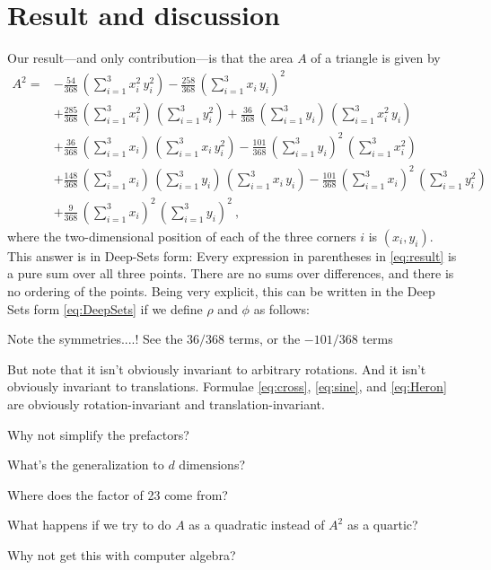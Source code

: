 \documentclass[12pt]{article}
\begin{document}
\section{Result and discussion}\label{sec:result}
Our result---and only contribution---is that the area $A$ of a triangle is given by
\begin{align}
A^2 = &
-\frac{ 54}{368}\,(\sum_{i=1}^3 x_i^2\,y_i^2) 
-\frac{258}{368}\,(\sum_{i=1}^3 x_i\,y_i)^2 \nonumber \\ &
+\frac{285}{368}\,(\sum_{i=1}^3 x_i^2)\,(\sum_{i=1}^3 y_i^2) 
+\frac{ 36}{368}\,(\sum_{i=1}^3 y_i)\,(\sum_{i=1}^3 x_i^2\,y_i) \nonumber \\ &
+\frac{ 36}{368}\,(\sum_{i=1}^3 x_i)\,(\sum_{i=1}^3 x_i\,y_i^2) 
-\frac{101}{368}\,(\sum_{i=1}^3 y_i)^2\,(\sum_{i=1}^3 x_i^2) \nonumber \\ &
+\frac{148}{368}\,(\sum_{i=1}^3 x_i)\,(\sum_{i=1}^3 y_i)\,(\sum_{i=1}^3 x_i\,y_i) 
-\frac{101}{368}\,(\sum_{i=1}^3 x_i)^2\,(\sum_{i=1}^3 y_i^2) \nonumber \\ &
+\frac{  9}{368}\,(\sum_{i=1}^3 x_i)^2\,(\sum_{i=1}^3 y_i)^2 ~, \label{eq:result}
\end{align}
where the two-dimensional position of each of the three corners $i$ is $(x_i, y_i)$.
This answer is in Deep-Sets form:
Every expression in parentheses in \eqref{eq:result} is a pure sum over all three points.
There are no sums over differences, and there is no ordering of the points.
Being very explicit, this can be written in the Deep Sets form \eqref{eq:DeepSets} if we define $\rho$ and $\phi$ as follows:

Note the symmetries....! See the $36/368$ terms, or the $-101/368$ terms

But note that it isn't obviously invariant to arbitrary rotations.
And it isn't obviously invariant to translations.
Formulae \eqref{eq:cross}, \eqref{eq:sine}, and \eqref{eq:Heron} are obviously rotation-invariant and translation-invariant.

Why not simplify the prefactors?

What's the generalization to $d$ dimensions?

Where does the factor of 23 come from?

What happens if we try to do $A$ as a quadratic instead of $A^2$ as a quartic?

Why not get this with computer algebra?
\end{document}
